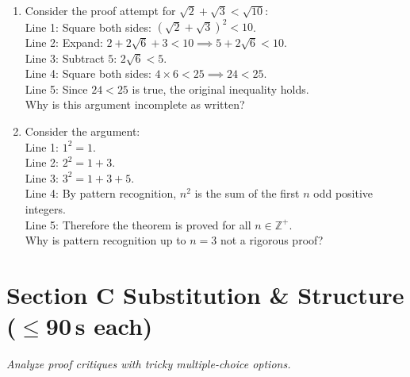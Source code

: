 \documentclass[11pt,a4paper]{article}
\begin{document}
\begin{enumerate}
\item Consider the proof attempt for $\sqrt{2} + \sqrt{3} < \sqrt{10}$:\\
Line 1: Square both sides: $(\sqrt{2}+\sqrt{3})^2 < 10$.\\
Line 2: Expand: $2 + 2\sqrt{6} + 3 < 10 \implies 5 + 2\sqrt{6} < 10$.\\
Line 3: Subtract $5$: $2\sqrt{6} < 5$.\\
Line 4: Square both sides: $4 \times 6 < 25 \implies 24 < 25$.\\
Line 5: Since $24 < 25$ is true, the original inequality holds.\\
Why is this argument incomplete as written?

\item Consider the argument:\\
Line 1: $1^2 = 1$.\\
Line 2: $2^2 = 1 + 3$.\\
Line 3: $3^2 = 1 + 3 + 5$.\\
Line 4: By pattern recognition, $n^2$ is the sum of the first $n$ odd positive integers.\\
Line 5: Therefore the theorem is proved for all $n \in \mathbb{Z}^+$.\\
Why is pattern recognition up to $n=3$ not a rigorous proof?

\end{enumerate}

\section*{Section C \quad Substitution \& Structure \hfill{\normalfont\small($\leq$90\,s each)}}

\noindent\textit{Analyze proof critiques with tricky multiple-choice options.}
\end{document}
